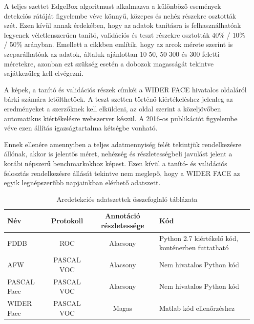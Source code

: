 A teljes szettet EdgeBox \cite{zitnick_edge_2014} algoritmust alkalmazva a különböző események detekciós rátáját figyelembe véve könnyű, közepes és nehéz részekre osztották szét. Ezen kívül annak érdekében, hogy az adatok tanításra is felhasználhatóak legyenek véletlenszerűen tanító, validációs és teszt részekre osztották 40\% / 10\% / 50\% arányban. Emellett a cikkben említik, hogy az arcok mérete szerint is szeparálhatóak az adatok, általuk ajánlottan 10-50, 50-300 és 300 feletti méretekre, azonban ezt szükség esetén a dobozok magasságát tekintve sajátkezűleg kell elvégezni.

A képek, a tanító és validációs részek címkéi a WIDER FACE hivatalos oldaláról \cite{noauthor_wider_nodate} bárki számára letölthetőek. A teszt szetten történő kiértékeléshez jelenleg az eredményeket a szerzőknek kell elküldeni, az oldal szerint a közeljövőben automatikus kiértékelésre webszerver készül. A 2016-os publikációt figyelembe véve ezen állítás igazságtartalma kétségbe vonható.

Ennek ellenére amennyiben a teljes adatmennyiség felét tekintjük rendelkezésre állónak, akkor is jelentős méret, nehézség és részletességbeli javulást jelent a korábi népszerű benchmarkokhoz képest. Ezen kívül a tanító- és validációs felosztás rendelkezésre állását tekintve nem meglepő, hogy a WIDER FACE az egyik legnépszerűbb napjainkban elérhető adatszett.

\begin{table}[!ht]
    \footnotesize
    \centering
    \renewcommand{\arraystretch}{1.5}
    \begin{tabular} {|l | c | c |l |}
        \hline
        Név & Protokoll & Annotáció részletessége & Kód \\
        \hline \hline
        FDDB & ROC & Alacsony & Python 2.7 kiértékelő kód, konténerben futtatható \\
        \hline
        AFW & PASCAL VOC & Alacsony & Nem hivatalos Python kód \\
        \hline
        PASCAL Face & PASCAL VOC & Alacsony & Nem hivatalos Python kód \\
        \hline
        WIDER Face & PASCAL VOC & Magas & Matlab kód ellenőrzéshez \\
        \hline
    \end{tabular}
    \caption{Arcdetekciós adatszettek összefoglaló táblázata}
    \label{tab:arcdetekcio}
\end{table}

